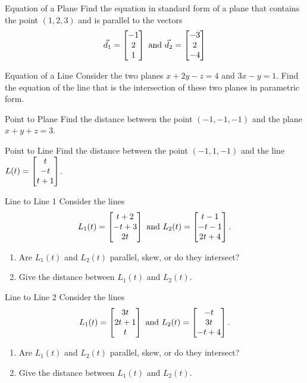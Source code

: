 \begin{revex}{Equation of a Plane}
Find the equation in standard form of a plane that contains the point $(1,2,3)$ and is parallel to the vectors $$\vec{d}_1=\begin{bmatrix}-1\\2\\1\end{bmatrix}\text{ and }\vec{d}_2=\begin{bmatrix}-3\\2\\-4\end{bmatrix}$$
\end{revex}

\begin{revex}{Equation of a Line}
Consider the two planes $x+2y-z=4$ and $3x-y=1$. Find the equation of the line that is the intersection of these two planes in parametric form.
\end{revex}

\begin{revex}{Point to Plane}
Find the distance between the point $(-1,-1,-1)$ and the plane $x+y+z=3$.
\end{revex}

\begin{revex}{Point to Line}
Find the distance between the point $(-1,1,-1)$ and the line $L(t)=\begin{bmatrix}t\\-t\\t+1\end{bmatrix}$.
\end{revex}

\begin{revex}{Line to Line 1}
Consider the lines $$L_1(t)=\begin{bmatrix}t+2\\-t+3\\2t\end{bmatrix}\text{ and }L_2(t)=\begin{bmatrix}t-1\\-t-1\\2t+4\end{bmatrix}. $$
\begin{enumerate}
\item Are $L_1(t)$ and $L_2(t)$ parallel, skew, or do they intersect?
\vspace{1em}
\item Give the distance between $L_1(t)$ and $L_2(t)$.
\end{enumerate}
\end{revex}

\begin{revex}{Line to Line 2}
Consider the lines $$L_1(t)=\begin{bmatrix}3t\\2t+1\\t\end{bmatrix}\text{ and }L_2(t)=\begin{bmatrix}-t\\3t\\-t+4\end{bmatrix}. $$
\begin{enumerate}
\item Are $L_1(t)$ and $L_2(t)$ parallel, skew, or do they intersect?
\vspace{1em}
\item Give the distance between $L_1(t)$ and $L_2(t)$.
\end{enumerate}
\end{revex}

